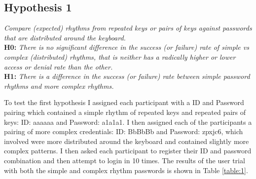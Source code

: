 \documentclass{article}
\begin{document}
\subsection{Hypothesis 1}
\begin{center}
\textit{Compare	(expected)	rhythms	from	repeated	keys	or	pairs	of	keys	
against	passwords that are	distributed	around	the	keyboard.} \newline \\

\textbf{H0:} \textit{There	is	no significant	difference	in	the	success	(or	failure)	rate	of	simple	vs	complex	(distributed)	rhythms,	that	is	neither has	a	radically	higher	or	lower	access	or	denial	rate	than	the	other.} \newline \\

\textbf{H1:} \textit{There is a difference in the	success	(or	failure)	rate	between	simple password rhythms	and	more complex rhythms.}
\end{center}

To test the first hypothesis I assigned each participant with a ID and Password pairing which contained a simple rhythm of repeated keys and repeated pairs of keys: ID: aaaaaa and Password: a1a1a1. I then assigned each of the participants a pairing of more complex credentials: ID: BbBbBb and Password: zpxjc6, which involved were more distributed around the keyboard and contained slightly more complex patterns. I then asked each participant to register their ID and password combination and then attempt to login in 10 times. The results of the user trial with both the simple and complex rhythm passwords is shown in Table \ref{table:1}. 
\end{document}
